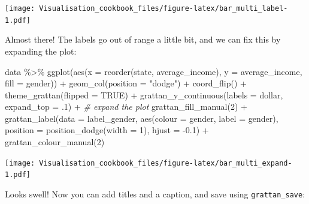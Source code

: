 \documentclass[
]{book}
\newenvironment{Shaded}{\begin{snugshade}}{\end{snugshade}}
\newcommand{\AttributeTok}[1]{\textcolor[rgb]{0.77,0.63,0.00}{#1}}
\newcommand{\CommentTok}[1]{\textcolor[rgb]{0.56,0.35,0.01}{\textit{#1}}}
\newcommand{\ConstantTok}[1]{\textcolor[rgb]{0.00,0.00,0.00}{#1}}
\newcommand{\DecValTok}[1]{\textcolor[rgb]{0.00,0.00,0.81}{#1}}
\newcommand{\FloatTok}[1]{\textcolor[rgb]{0.00,0.00,0.81}{#1}}
\newcommand{\FunctionTok}[1]{\textcolor[rgb]{0.00,0.00,0.00}{#1}}
\newcommand{\NormalTok}[1]{#1}
\newcommand{\SpecialCharTok}[1]{\textcolor[rgb]{0.00,0.00,0.00}{#1}}
\newcommand{\StringTok}[1]{\textcolor[rgb]{0.31,0.60,0.02}{#1}}
\begin{document}
\texttt{[image: Visualisation\_cookbook\_files/figure-latex/bar\_multi\_label-1.pdf]}

Almost there! The labels go out of range a little bit, and we can fix this by expanding the plot:

\begin{Shaded}
\begin{Highlighting}[]
\NormalTok{data }\SpecialCharTok{\%\textgreater{}\%} 
  \FunctionTok{ggplot}\NormalTok{(}\FunctionTok{aes}\NormalTok{(}\AttributeTok{x =} \FunctionTok{reorder}\NormalTok{(state, average\_income),}
             \AttributeTok{y =}\NormalTok{ average\_income,}
             \AttributeTok{fill =}\NormalTok{ gender)) }\SpecialCharTok{+} 
  \FunctionTok{geom\_col}\NormalTok{(}\AttributeTok{position =} \StringTok{"dodge"}\NormalTok{) }\SpecialCharTok{+} 
  \FunctionTok{coord\_flip}\NormalTok{() }\SpecialCharTok{+} 
  \FunctionTok{theme\_grattan}\NormalTok{(}\AttributeTok{flipped =} \ConstantTok{TRUE}\NormalTok{) }\SpecialCharTok{+} 
  \FunctionTok{grattan\_y\_continuous}\NormalTok{(}\AttributeTok{labels =}\NormalTok{ dollar, }
                       \AttributeTok{expand\_top =}\NormalTok{ .}\DecValTok{1}\NormalTok{) }\SpecialCharTok{+} \CommentTok{\# expand the plot}
  \FunctionTok{grattan\_fill\_manual}\NormalTok{(}\DecValTok{2}\NormalTok{) }\SpecialCharTok{+} 
  \FunctionTok{grattan\_label}\NormalTok{(}\AttributeTok{data =}\NormalTok{ label\_gender,}
                \FunctionTok{aes}\NormalTok{(}\AttributeTok{colour =}\NormalTok{ gender,}
                    \AttributeTok{label =}\NormalTok{ gender), }
                \AttributeTok{position =} \FunctionTok{position\_dodge}\NormalTok{(}\AttributeTok{width =} \DecValTok{1}\NormalTok{), }
                \AttributeTok{hjust =} \SpecialCharTok{{-}}\FloatTok{0.1}\NormalTok{) }\SpecialCharTok{+} 
  \FunctionTok{grattan\_colour\_manual}\NormalTok{(}\DecValTok{2}\NormalTok{)}
\end{Highlighting}
\end{Shaded}

\texttt{[image: Visualisation\_cookbook\_files/figure-latex/bar\_multi\_expand-1.pdf]}

Looks swell! Now you can add titles and a caption, and save using \texttt{grattan\_save}:
\end{document}
